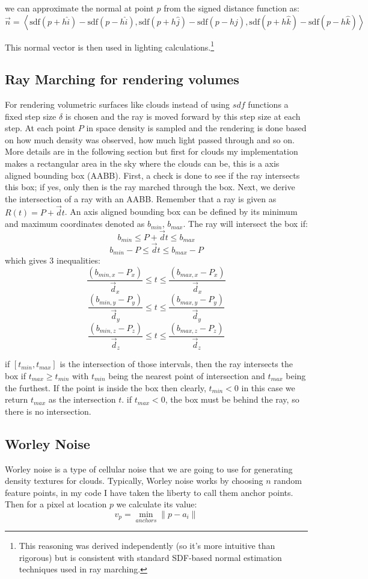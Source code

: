 we can approximate the normal at point $p$ from the signed distance function as:
\[
\vec{n} = \left\langle 
\text{sdf}(p + h\hat{i}) - \text{sdf}(p - h\hat{i}),
\text{sdf}(p + h\hat{j}) - \text{sdf}(p - h\hat{j}),
\text{sdf}(p + h\hat{k}) - \text{sdf}(p - h\hat{k})
\right\rangle
\]

This normal vector is then used in lighting calculations.\footnote{This reasoning was derived independently (so it's more intuitive than rigorous) but is consistent with standard SDF-based normal estimation techniques used in ray marching.}

\subsection{Ray Marching for rendering volumes}
For rendering volumetric surfaces like clouds instead of using $sdf$ functions a fixed step size $\delta$ is chosen and the ray is moved forward by this step size at each step. At each point $P$ in space density is sampled and the rendering is done based on how much density was observed, how much light passed through and so on. More details are in the following section but first for clouds my implementation makes a rectangular area in the sky where the clouds can be, this is a axis aligned bounding box (AABB). First, a check is done to see if the ray intersects this box; if yes, only then is the ray marched through the box.
Next, we derive the intersection of a ray with an AABB. Remember that a ray is given as $R(t) = P + \vec{d}t$. An axis aligned bounding box can be defined by its minimum and maximum coordinates denoted as $b_{min}$, $b_{max}$. The ray will intersect the box if:
\[
b_{min} \le P + \vec{d}t \le b_{max}
\]
\[
b_{min} - P \le \vec{d}t \le b_{max} - P
\]
which gives 3 inequalities:
\[
\frac{(b_{min, x} - P_x)}{\vec{d}_x} \le t \le \frac{(b_{max, x} - P_x)}{\vec{d}_x}
\]
\[
\frac{(b_{min, y} - P_y)}{\vec{d}_y} \le t \le \frac{(b_{max, y} - P_y)}{\vec{d}_y}
\]
\[
\frac{(b_{min, z} - P_z)}{\vec{d}_z} \le t \le \frac{(b_{max, z} - P_z)}{\vec{d}_z}
\]

if $[t_{min}, t_{max}]$ is the intersection of those intervals, then the ray intersects the box if $t_{max} \ge t_{min}$ with $t_{min}$ being the nearest point of intersection and $t_{max}$ being the furthest. If the point is inside the box then clearly, $t_{min} < 0$ in this case we return $t_{max}$ as the intersection $t$. if $t_{max} < 0$, the box must be behind the ray, so there is no intersection.

\subsection{Worley Noise}
Worley noise is a type of cellular noise that we are going to use for generating density textures for clouds. Typically, Worley noise works by choosing $n$ random feature points, in my code I have taken the liberty to call them anchor points. Then for a pixel at location $p$ we calculate its value:
\[
v_p = \min_{anchors} \|p - a_i\| 
\]

